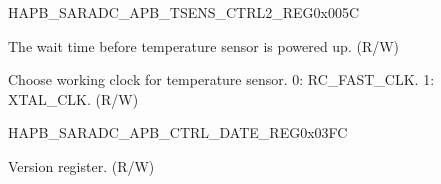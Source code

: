 \begin{register}{H}{APB\_SARADC\_APB\_TSENS\_CTRL2\_REG}{0x005C}\label{regdesc:APBSARADCTSENSCTRL2REG}
%
%
%
%
%
\regnewline%
\begin{regdesc}\begin{reglist}
\label{fielddesc:APBSARADCTSENSXPDWAIT}\item [APB\_SARADC\_TSENS\_XPD\_WAIT] The wait time before temperature sensor is powered up. (R/W)
\label{fielddesc:APBSARADCTSENSCLKSEL}\item [APB\_SARADC\_TSENS\_CLK\_SEL] Choose working clock for temperature sensor. 0: RC\_FAST\_CLK. 1: XTAL\_CLK. (R/W)
\end{reglist}\end{regdesc}
\end{register}



\begin{register}{H}{APB\_SARADC\_APB\_CTRL\_DATE\_REG}{0x03FC}\label{regdesc:APBSARADCCTRLDATEREG}
%
\regnewline%
\begin{regdesc}\begin{reglist}
\label{fielddesc:APBSARADCDATE}\item [APB\_SARADC\_DATE] Version register. (R/W)
\end{reglist}\end{regdesc}
\end{register}


